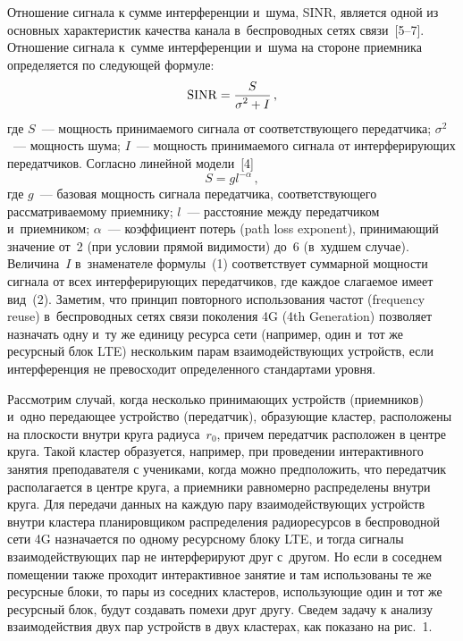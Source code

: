 \begin{multicols}{2}
  Отношение сигнала к сумме интерференции и~шума, SINR,
  является одной из основных характеристик качества канала
  в~беспроводных сетях связи~[5--7]. Отношение сигнала к~сумме интерференции 
и~шума на стороне приемника определяется по следующей формуле:
  \begin{equation}
  \mathrm{SINR} = \displaystyle\frac{\displaystyle S\mathstrut}{\displaystyle \sigma^2 +I\mathstrut}\,,
  \label{e1-gai}
  \end{equation}
где $S$~--- мощность принимаемого сигнала от соответствующего
передатчика; $\sigma^2$~--- мощность шума; $I$~--- мощность принимаемого
сигнала от интерферирующих передатчиков. Согласно линейной модели~[4]
\begin{equation}
S=gl^{-\alpha}\,,
\label{e2-gai}
\end{equation}
где $g$~--- базовая мощность сигнала передатчика, соответствующего
рассматриваемому приемнику; $l$~--- расстояние между передатчиком
и~приемником; $\alpha$~--- коэффициент потерь (path loss exponent),
принимающий значение от~2 (при условии прямой видимости) до~6 (в~худшем
случае). Величина~$I$ в~знаменателе формулы~(1) соответствует суммарной
мощности сигнала от всех интерферирующих передатчиков, где каждое
слагаемое имеет вид~(2). Заметим, что принцип повторного использования
частот (frequency reuse) в~беспроводных сетях связи поколения 4G (4th
Generation) позволяет назначать одну и~ту же единицу ресурса сети (например,
один и~тот же ресурсный блок LTE) нескольким парам взаимодействующих
устройств, если интерференция не превосходит определенного стандартами
уровня.

  Рассмотрим случай, когда несколько принимающих устройств (приемников)
и~одно передающее устройство (передатчик), образующие кластер,
расположены на плоскости внутри круга радиуса~$r_0$, причем передатчик
расположен в центре круга. Такой кластер образуется, например, при
проведении интерактивного занятия преподавателя с учениками, когда можно
предположить, что передатчик располагается в центре круга, а приемники
равномерно распределены внутри круга. Для передачи данных на каждую пару
взаимодействующих устройств внутри кластера планировщиком распределения
радиоресурсов в беспроводной сети 4G назначается по одному ресурсному
блоку LTE, и тогда сигналы взаимодействующих пар не интерферируют друг
с~другом. Но если в соседнем помещении также проходит интерактивное
занятие и там использованы те же ресурсные блоки, то пары из соседних
кластеров, использующие один и тот же ресурсный блок, будут создавать
помехи друг другу. Сведем задачу к анализу взаимодействия двух пар
устройств в двух кластерах, как показано на рис.~1.




\end{multicols}
